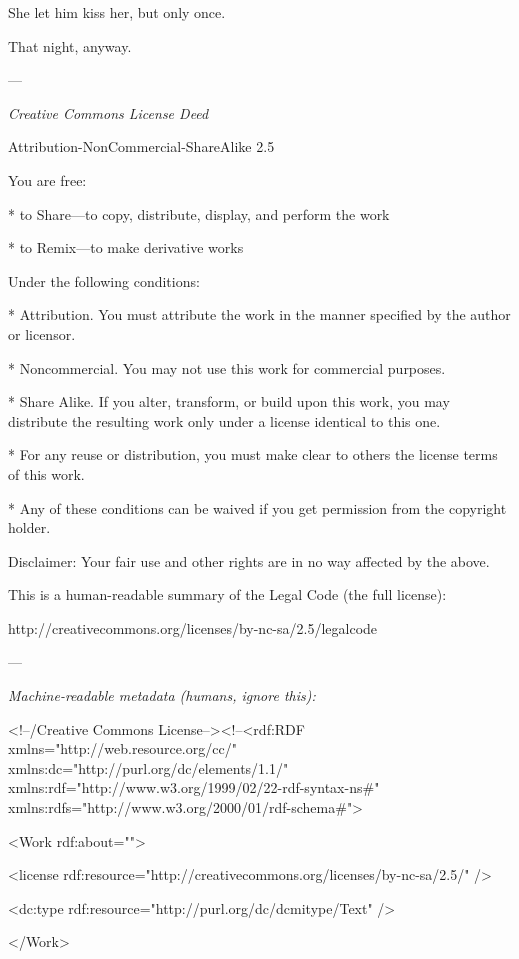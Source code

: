 She let him kiss her, but only once.

That night, anyway.

—

\emph{Creative Commons License Deed}

Attribution-NonCommercial-ShareAlike 2.5

You are free:

* to Share—to copy, distribute, display, and perform the work

* to Remix—to make derivative works

Under the following conditions:

* Attribution. You must attribute the work in the manner specified
by the author or licensor.

* Noncommercial. You may not use this work for commercial
purposes.

* Share Alike. If you alter, transform, or build upon this work,
you may distribute the resulting work only under a license
identical to this one.



* For any reuse or distribution, you must make clear to others the
license terms of this work.

* Any of these conditions can be waived if you get permission from
the copyright holder.

Disclaimer: Your fair use and other rights are in no way affected
by the above.

This is a human-readable summary of the Legal Code (the full
license):

http://creativecommons.org/licenses/by-nc-sa/2.5/legalcode

—

\emph{Machine-readable metadata (humans, ignore this):}

\textless{}!--/Creative Commons
License--\textgreater{}\textless{}!--\textless{}rdf:RDF
xmlns="http://web.resource.org/cc/"
xmlns:dc="http://purl.org/dc/elements/1.1/"
xmlns:rdf="http://www.w3.org/1999/02/22-rdf-syntax-ns\#"
xmlns:rdfs="http://www.w3.org/2000/01/rdf-schema\#"\textgreater{}

\textless{}Work rdf:about=""\textgreater{}

\textless{}license
rdf:resource="http://creativecommons.org/licenses/by-nc-sa/2.5/"
/\textgreater{}

\textless{}dc:type rdf:resource="http://purl.org/dc/dcmitype/Text"
/\textgreater{}

\textless{}/Work\textgreater{}

